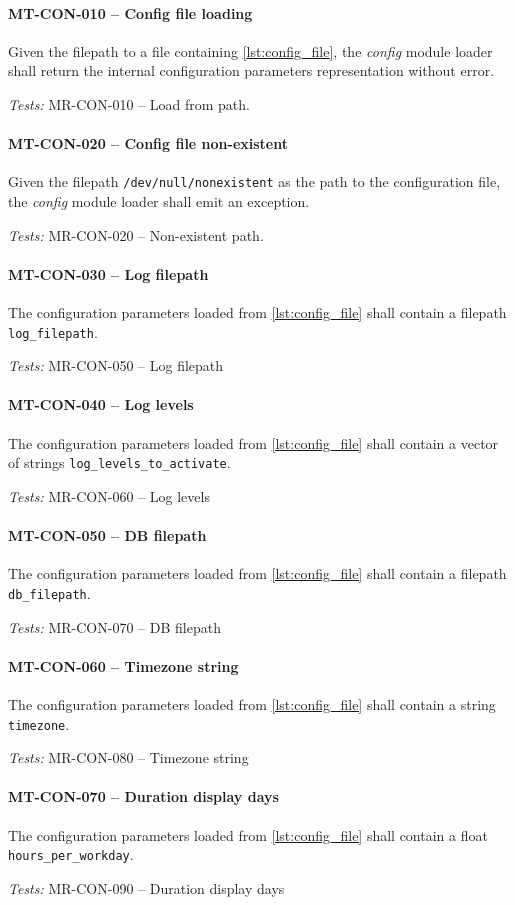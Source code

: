 \paragraph{MT-CON-010 -- Config file loading}
Given the filepath to a file containing \cref{lst:config_file},
the \emph{config} module loader shall return the internal configuration
parameters representation without error.

\textit{Tests: } MR-CON-010 -- Load from path.

\paragraph{MT-CON-020 -- Config file non-existent}
Given the filepath \lstinline{/dev/null/nonexistent} as the path
to the configuration file, the \emph{config} module loader shall
emit an exception.

\textit{Tests: } MR-CON-020 -- Non-existent path.

\paragraph{MT-CON-030 -- Log filepath}
The configuration parameters loaded from \cref{lst:config_file}
shall contain a filepath \lstinline{log_filepath}.

\textit{Tests: } MR-CON-050 -- Log filepath

\paragraph{MT-CON-040 -- Log levels}
The configuration parameters loaded from \cref{lst:config_file}
shall contain a vector of strings \lstinline{log_levels_to_activate}.

\textit{Tests: } MR-CON-060 -- Log levels

\paragraph{MT-CON-050 -- DB filepath}
The configuration parameters loaded from \cref{lst:config_file}
shall contain a filepath \lstinline{db_filepath}.

\textit{Tests: } MR-CON-070 -- DB filepath

\paragraph{MT-CON-060 -- Timezone string}
The configuration parameters loaded from \cref{lst:config_file}
shall contain a string \lstinline{timezone}.

\textit{Tests: } MR-CON-080 -- Timezone string

\paragraph{MT-CON-070 -- Duration display days}
The configuration parameters loaded from \cref{lst:config_file}
shall contain a float \lstinline{hours_per_workday}.

\textit{Tests: } MR-CON-090 -- Duration display days
